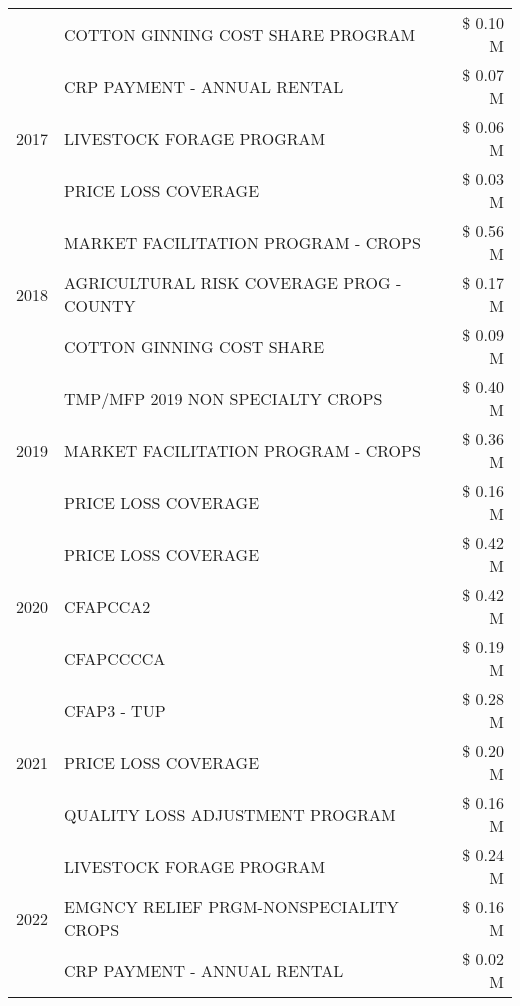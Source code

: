 \begin{tabular}{llr}
 & COTTON GINNING COST SHARE PROGRAM & \$ 0.10 M \\
\cline{1-3}
\multirow[t]{3}{*}{2017} & CRP PAYMENT - ANNUAL RENTAL & \$ 0.07 M \\
 & LIVESTOCK FORAGE PROGRAM & \$ 0.06 M \\
 & PRICE LOSS COVERAGE & \$ 0.03 M \\
\cline{1-3}
\multirow[t]{3}{*}{2018} & MARKET FACILITATION PROGRAM - CROPS & \$ 0.56 M \\
 & AGRICULTURAL RISK COVERAGE PROG - COUNTY & \$ 0.17 M \\
 & COTTON GINNING COST SHARE & \$ 0.09 M \\
\cline{1-3}
\multirow[t]{3}{*}{2019} & TMP/MFP 2019 NON SPECIALTY CROPS & \$ 0.40 M \\
 & MARKET FACILITATION PROGRAM - CROPS & \$ 0.36 M \\
 & PRICE LOSS COVERAGE & \$ 0.16 M \\
\cline{1-3}
\multirow[t]{3}{*}{2020} & PRICE LOSS COVERAGE & \$ 0.42 M \\
 & CFAPCCA2 & \$ 0.42 M \\
 & CFAPCCCCA & \$ 0.19 M \\
\cline{1-3}
\multirow[t]{3}{*}{2021} & CFAP3 - TUP & \$ 0.28 M \\
 & PRICE LOSS COVERAGE & \$ 0.20 M \\
 & QUALITY LOSS ADJUSTMENT PROGRAM & \$ 0.16 M \\
\cline{1-3}
\multirow[t]{3}{*}{2022} & LIVESTOCK FORAGE PROGRAM & \$ 0.24 M \\
 & EMGNCY RELIEF PRGM-NONSPECIALITY CROPS & \$ 0.16 M \\
 & CRP PAYMENT - ANNUAL RENTAL & \$ 0.02 M \\
\cline{1-3}
\bottomrule
\end{tabular}
